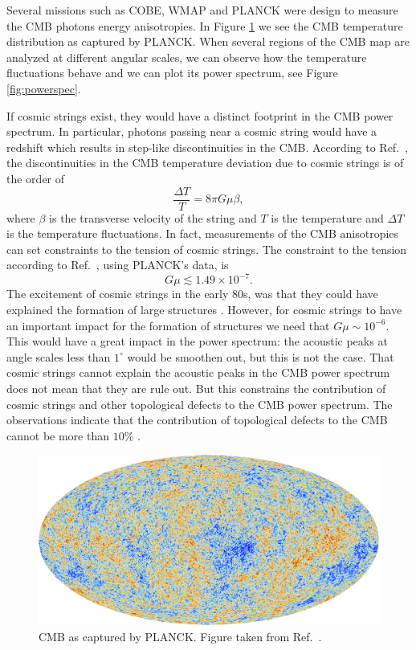Several missions such as COBE, WMAP and PLANCK were design to measure the CMB photons energy anisotropies. In Figure \ref{fig:cmb} we see the CMB temperature distribution as captured by PLANCK. When several regions of the CMB map are analyzed at different angular scales, we can observe how the temperature fluctuations behave and we can plot its power spectrum, see Figure \ref{fig:powerspec}.

If cosmic strings exist, they would have a distinct footprint in the CMB power spectrum.  In particular, photons passing near a cosmic string would have a redshift which results in step-like discontinuities in the CMB. Ac\-cord\-ing to Ref.\ \cite{kaiser1984}, the discontinuities in the CMB temperature deviation due to cosmic strings is of the order of
\begin{equation}
	\frac{\Delta T}{T} = 8\pi G \mu \beta,
\end{equation}
where $\beta$ is the transverse velocity of the string and $T$ is the temperature and $\Delta T$ is the temperature fluctuations.
In fact, measurements of the CMB anisotropies can set constraints to the tension of cosmic strings. The con\-straint to the tension according to Ref.\ \cite{Lazanu_2015}, using PLANCK's data, is
\begin{equation}
	G\mu \lesssim 1.49\times 10^{-7}.
\end{equation}
The excitement of cosmic strings in the early 80s, was that they could have explained the formation of large structures \cite{kibble1986}. However, for cosmic strings to have an important impact for the formation of structures we need that $G\mu\sim 10^{-6}$. This would have a great impact in the power spectrum: the acoustic peaks at angle scales less than $1^{\circ}$ would be smoothen out, but this is not the case. That cosmic strings cannot explain the acoustic peaks in the CMB power spectrum does not mean that they are rule out. But this constrains the contribution of cosmic strings and other topological defects to the CMB power spectrum. The observations indicate that the contribution of topological defects to the CMB cannot be more than $10\%$ \cite{pogo2006}.

\begin{figure}
	\centering
	\includegraphics[scale=0.2]{./figures/Planck_CMB.jpg}
	\caption{CMB as captured by PLANCK. Figure taken from Ref.\ \cite{cmb}.}
	\label{fig:cmb}
\end{figure}



